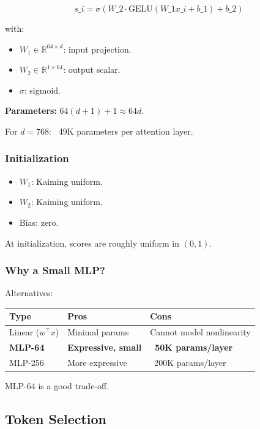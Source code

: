 \[
s\_i = \sigma\!\left(W\_2 \cdot \text{GELU}(W\_1 x\_i + b\_1) + b\_2\right)
\tag{4.1}
\]

with:
\begin{itemize}
\item $W_1 \in \mathbb{R}^{64 \times d}$: input projection.
\item $W_2 \in \mathbb{R}^{1 \times 64}$: output scalar.
\item $\sigma$: sigmoid.

\end{itemize}
\textbf{Parameters:} $64 (d + 1) + 1 \approx 64 d$.

For $d = 768$: ~49K parameters per attention layer.

\subsubsection{Initialization}

\begin{itemize}
\item $W_1$: Kaiming uniform.
\item $W_2$: Kaiming uniform.
\item Bias: zero.

\end{itemize}
At initialization, scores are roughly uniform in $(0, 1)$.

\subsubsection{Why a Small MLP?}

Alternatives:

\begin{table}[H]
\centering
\small
\begin{tabular}{lll}
\toprule
\textbf{Type} & \textbf{Pros} & \textbf{Cons} \\
\midrule
Linear ($w^\top x$) & Minimal params & Cannot model nonlinearity \\
\textbf{MLP-64} & \textbf{Expressive, small} & \textbf{~50K params/layer} \\
MLP-256 & More expressive & ~200K params/layer \\
\bottomrule
\end{tabular}
\end{table}

MLP-64 is a good trade-off.

\subsection{Token Selection}

